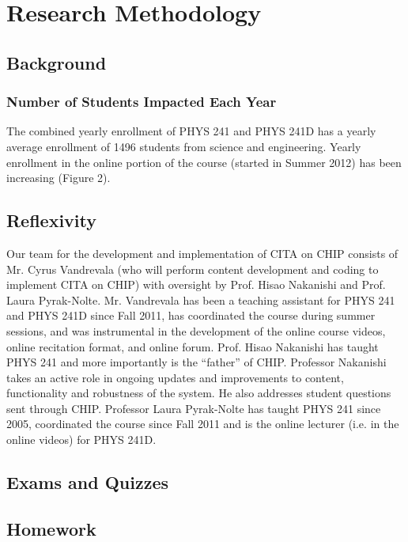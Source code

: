 \chapter[Chapter 3: Research Methodology]{Research Methodology}

\section{Background}

\subsection{Number of Students Impacted Each Year}

The combined yearly enrollment of PHYS
241 and PHYS 241D has a yearly average
enrollment of 1496 students from science and
engineering. Yearly enrollment in the online
portion of the course (started in Summer 2012)
has been increasing (Figure 2).

\section{Reflexivity}

Our team for the development and implementation of CITA on CHIP consists of Mr. Cyrus
Vandrevala (who will perform content development and coding to implement CITA on CHIP)
with oversight by Prof. Hisao Nakanishi and Prof. Laura Pyrak-Nolte. Mr. Vandrevala has been
a teaching assistant for PHYS 241 and PHYS 241D since Fall 2011, has coordinated the course
during summer sessions, and was instrumental in the development of the online course videos,
online recitation format, and online forum. Prof. Hisao Nakanishi has taught PHYS 241 and
more importantly is the “father” of CHIP. Professor Nakanishi takes an active role in ongoing
updates and improvements to content, functionality and robustness of the system. He also
addresses student questions sent through CHIP. Professor Laura Pyrak-Nolte has taught PHYS
241 since 2005, coordinated the course since Fall 2011 and is the online lecturer (i.e. in the
online videos) for PHYS 241D.

\section{Exams and Quizzes}



\section{Homework}

